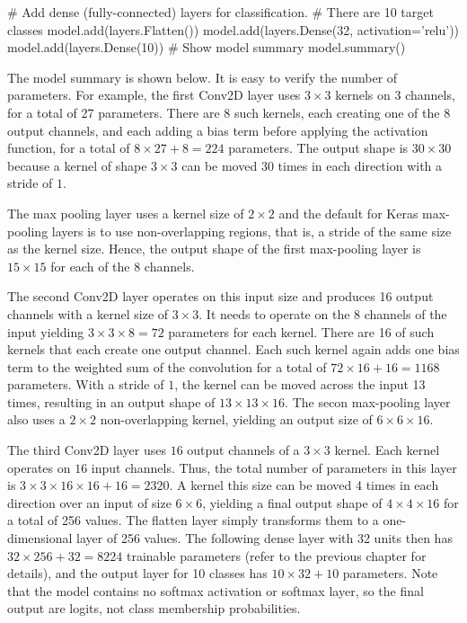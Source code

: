 \begin{pythoncode}
# Add dense (fully-connected) layers for classification. 
# There are 10 target classes
model.add(layers.Flatten())
model.add(layers.Dense(32, activation='relu'))
model.add(layers.Dense(10))
# Show model summary
model.summary()
\end{pythoncode}

The model summary is shown below. It is easy to verify the number of parameters. For example, the first Conv2D layer uses $3 \times 3$ kernels on 3 channels, for a total of 27 parameters. There are 8 such kernels, each creating one of the 8 output channels, and each adding a bias term before applying the activation function, for a total of $8 \times 27 + 8 = 224$ parameters. The output shape is $30 \times 30$ because a kernel of shape $3 \times 3$ can be moved 30 times in each direction with a stride of $1$.

The max pooling layer uses a kernel size of $2 \times 2$ and the default for Keras max-pooling layers is to use non-overlapping regions, that is, a stride of the same size as the kernel size. Hence, the output shape of the first max-pooling layer is $15 \times 15$ for each of the 8 channels. 

The second Conv2D layer operates on this input size and produces 16 output channels with a kernel size of $3 \times 3$. It needs to operate on the 8 channels of the input yielding $3 \times 3 \times 8 = 72$ parameters for each kernel. There are 16 of such kernels that each create one output channel. Each such kernel again adds one bias term to the weighted sum of the convolution for a total of $72 \times 16 + 16 = 1168$ parameters. With a stride of $1$, the kernel can be moved across the input 13 times, resulting in an output shape of $13 \times 13 \times 16$. The secon max-pooling layer also uses a $2 \times 2$ non-overlapping kernel, yielding an output size of $6 \times 6 \times 16$.

The third Conv2D layer uses $16$ output channels of a $3 \times 3$ kernel. Each kernel operates on $16$ input channels. Thus, the total number of parameters in this layer is $3 \times 3 \times 16 \times 16 + 16 = 2320$. A kernel this size can be moved 4 times in each direction over an input of size $6 \times 6$, yielding a final output shape of $4 \times 4 \times 16$ for a total of 256 values. The flatten layer simply transforms them to a one-dimensional layer of 256 values. The following dense layer with 32 units then has $32 \times 256 + 32 = 8224$ trainable parameters (refer to the previous chapter for details), and the output layer for 10 classes has $10 \times 32 + 10$ parameters. Note that the model contains no softmax activation or softmax layer, so the final output are logits, not class membership probabilities. 

